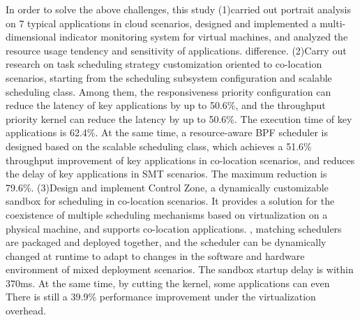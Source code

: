 In order to solve the above challenges, this study (1)carried out portrait analysis on 7 typical applications in cloud scenarios, designed and implemented a multi-dimensional indicator monitoring system for virtual machines, and analyzed the resource usage tendency and sensitivity of applications. difference. (2)Carry out research on task scheduling strategy customization oriented to co-location scenarios, starting from the scheduling subsystem configuration and scalable scheduling class. Among them, the responsiveness priority configuration can reduce the latency of key applications by up to 50.6\%, and the throughput priority kernel can reduce the latency by up to 50.6\%. The execution time of key applications is 62.4\%. At the same time, a resource-aware BPF scheduler is designed based on the scalable scheduling class, which achieves a 51.6\% throughput improvement of key applications in co-location scenarios, and reduces the delay of key applications in SMT scenarios. The maximum reduction is 79.6\%. (3)Design and implement Control Zone, a dynamically customizable sandbox for scheduling in co-location scenarios. It provides a solution for the coexistence of multiple scheduling mechanisms based on virtualization on a physical machine, and supports co-location applications. , matching schedulers are packaged and deployed together, and the scheduler can be dynamically changed at runtime to adapt to changes in the software and hardware environment of mixed deployment scenarios. The sandbox startup delay is within 370ms. At the same time, by cutting the kernel, some applications can even There is still a 39.9\% performance improvement under the virtualization overhead.



\pagestyle{enfrontmatterstyle}%
\cleardoublepage\pagestyle{frontmatterstyle}%

